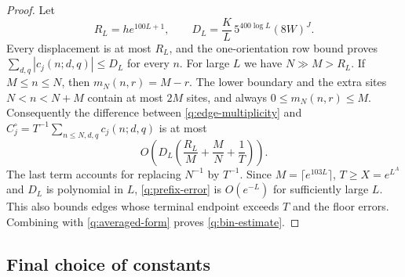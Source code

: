 \begin{proof}
Let
\[
 R_L=h e^{100L+1},\qquad
 D_L=\frac KL\,5^{400\log L}(8W)^J.
\]
Every displacement is at most $R_L$, and the one-orientation row
bound proves $\sum_{d,q}|c_j(n;d,q)|\le D_L$ for every $n$.
For large $L$ we have $N\gg M>R_L$. If $M\le n\le N$, then
$m_N(n,r)=M-r$. The lower boundary and the extra sites $N<n<N+M$
contain at most $2M$ sites, and always $0\le m_N(n,r)\le M$.
Consequently the difference between \eqref{q:edge-multiplicity} and
$C_j^\circ=T^{-1}\sum_{n\le N,d,q}c_j(n;d,q)$ is at most
\begin{equation}\label{q:prefix-error}
 O\left(D_L\left(\frac{R_L}{M}+\frac MN+\frac1T\right)\right).
\end{equation}
The last term accounts for replacing $N^{-1}$ by $T^{-1}$.
Since $M=\lceil e^{103L}\rceil$, $T\ge X=e^{L^A}$ and $D_L$ is
polynomial in $L$, \eqref{q:prefix-error} is $O(e^{-L})$ for
sufficiently large $L$. This also bounds edges whose terminal endpoint
exceeds $T$ and the floor errors. Combining with
\eqref{q:averaged-form} proves \eqref{q:bin-estimate}.
\end{proof}

\subsection{Final choice of constants}

